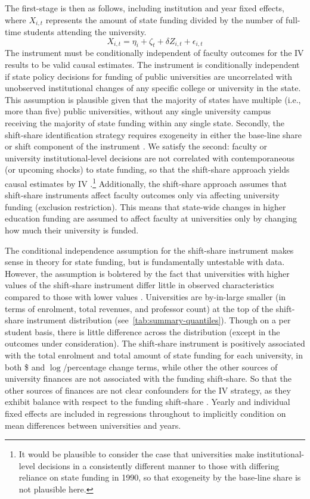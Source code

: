 The first-stage is then as follows, including institution and year fixed effects, where $X_{i,t}$ represents the amount of state funding divided by the number of full-time students attending the university.
\begin{equation}
    \label{eqn:firststage}
    X_{i,t} = \eta_i + \zeta_t + \delta Z_{i,t} + \epsilon_{i,t}
\end{equation}
The instrument must be conditionally independent of faculty outcomes for the IV results to be valid causal estimates.
The instrument is conditionally independent if state policy decisions for funding of public universities are uncorrelated with unobserved institutional changes of any specific college or university in the state.
This assumption is plausible given that the majority of states have multiple (i.e., more than five) public universities, without any single university campus receiving the majority of state funding within any single state.
Secondly, the shift-share identification strategy requires exogeneity in either the base-line share or shift component of the instrument \citep{borusyak2022quasi}.
We satisfy the second: faculty or university institutional-level decisions are not correlated with contemporaneous (or upcoming shocks) to state funding, so that the shift-share approach yields causal estimates by IV \citep{NBERw27885}.\footnote{
    It would be plausible to consider the case that universities make institutional-level decisions in a consistently different manner to those with differing reliance on state funding in 1990, so that exogeneity by the base-line share is not plausible here.
}
Additionally, the shift-share approach assumes that shift-share instruments affect faculty outcomes only via affecting university funding (exclusion restriction).
This means that state-wide changes in higher education funding are assumed to affect faculty at universities only by changing how much their university is funded.

The conditional independence assumption for the shift-share instrument makes sense in theory for state funding, but is fundamentally untestable with data.
However, the assumption is bolstered by the fact that universities with higher values of the shift-share instrument differ little in observed characteristics compared to those with lower values \citep{pei2019poorly}.
Universities are by-in-large smaller (in terms of enrolment, total revenues, and professor count) at the top of the shift-share instrument distribution (see~\autoref{tab:summary-quantiles}).
Though on a per student basis, there is little difference across the distribution (except in the outcomes under consideration).
The shift-share instrument is positively associated with the total enrolment and total amount of state funding for each university, in both \$ and $\log$/percentage change terms, while other the other sources of university finances are not associated with the funding shift-share.
So that the other sources of finances are not clear confounders for the IV strategy, as they exhibit balance with respect to the funding shift-share \citep{pei2019poorly}.
Yearly and individual fixed effects are included in regressions throughout to implicitly condition on mean differences between universities and years.

